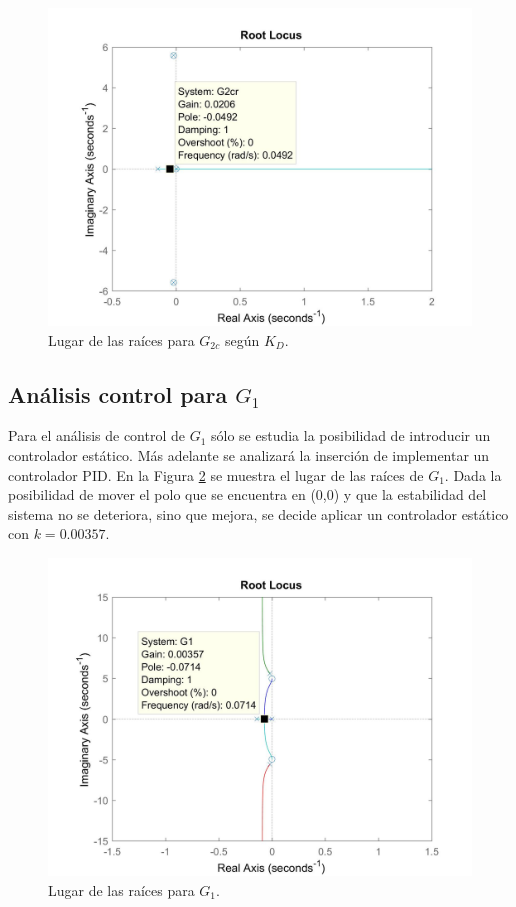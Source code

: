 \documentclass[journal]{IEEEtran}
\begin{document}
\begin{figure}[h!]
\caption{Lugar de las raíces para $G_{2c}$ según $K_D$.\label{fig:rlocusG2PID}}
  \centering
\includegraphics[scale=0.18]{control/PID_G2.jpg}
\end{figure}

\subsection{Análisis control para $G_1$}
Para el análisis de control de $G_1$ sólo se estudia la posibilidad de introducir un controlador estático. Más adelante se analizará la inserción de implementar un controlador PID. En la Figura \ref{fig:rlocusG1} se muestra el lugar de las raíces de $G_1$. Dada la posibilidad de mover el polo que se encuentra en (0,0) y que la estabilidad del sistema no se deteriora, sino que mejora, se decide aplicar un controlador estático con $k=0.00357$.\\   

\begin{figure}[h!]
\caption{Lugar de las raíces para $G_1$.\label{fig:rlocusG1}}
  \centering
\includegraphics[scale=0.18]{control/k_G1.jpg}
\end{figure}
\end{document}
